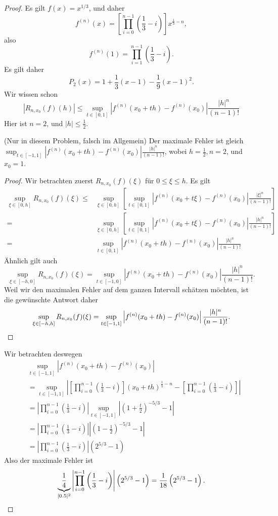 \begin{proof}
	Es gilt $f(x)=x^{1 / 3}$, und daher
	\[
		f^{(n)}(x)=\left[\prod_{i=0}^{n-1} \left( \frac{1}{3}-i \right) \right]x^{\frac{1}{3}-n} 
	,\] 
	also
	\[
		f^{(n)}(1)=\prod_{i=1}^{n-1} \left( \frac{1}{3}-i \right)  
	.\] 
	Es gilt daher
	\[
	P_2(x)=1+\frac{1}{3}(x-1)-\frac{1}{9}(x-1)^2
	.\] 
	Wir wissen schon
	\begin{equation}\tag{5.6.20}
		\left| R_{n,x_0}(f)(h) \right| \le \sup_{t\in[0,1]}\left| f^{(n)}(x_0+th)-f^{(n)}(x_0) \right| \frac{|h|^n}{(n-1)!}
	\end{equation}
	Hier ist $n=2$, und $|h|\le \frac{1}{2}$. 
\begin{tcolorbox}[title=Vereinfachung]
	(Nur in diesem Problem, falsch im Allgemein) Der maximale Fehler ist gleich $\sup_{t\in [-1,1]}\left| f^{(n)}(x_0+th)-f^{(n)}(x_0) \right| \frac{|h|^n}{(n-1)!}$, wobei $h=\frac{1}{2},n=2$, und $x_0=1$.
\begin{proof}
	Wir betrachten zuerst $R_{n,x_0}(f)(\xi)$ f\"{u}r $0\le\xi\le h$. Es gilt
	\begin{align*}
		\sup_{\xi\in [0,h]}R_{n,x_0}(f)(\xi)\le& \sup_{\xi\in [0,h]}\left[\sup_{t\in [0,1]}\left| f^{(n)}(x_0+t\xi)-f^{(n)}(x_0) \right| \frac{|\xi|^n}{(n-1)!}\right]\\
		=& \sup_{\xi\in [0,h]}\left[\sup_{t\in [0,1]}\left| f^{(n)}(x_0+t\xi)-f^{(n)}(x_0) \right| \frac{|h|^n}{(n-1)!} \right] \\
		=&\sup_{t\in [0,1]}\left| f^{(n)}(x_0+th)-f^{(n)}(x_0) \right| \frac{|h|^n}{(n-1)!}
	\end{align*}
	Ähnlich gilt auch
	\[
		\sup_{\xi\in[-h,0]}R_{n,x_0}(f)(\xi)=\sup_{t\in [-1,0]}\left| f^{(n)}(x_0+th)-f^{(n)}(x_0) \right| \frac{|h|^n}{(n-1)!}
	.\] 
	Weil wir den maximalen Fehler auf dem ganzen Intervall schätzen möchten, ist die gewünschte Antwort daher
	\[
		\sup_{\xi\in[-h,h]}R_{n,x_0}(f)(\xi)=\sup_{t\in[-1,1]}\left| f^{(n)}(x_0+th)-f^{(n)}(x_0) \right| \frac{|h|^n}{(n-1)!}
	.\qedhere\] 
\end{proof}
\end{tcolorbox}
Wir betrachten deswegen
\begin{align*}
	&\sup_{t\in [-1,1]}\left| f^{(n)}(x_0+th)-f^{(n)}(x_0) \right|\\
	&= \sup_{t\in [-1,1]}\left| \left[\prod_{i=0}^{n-1}\left( \frac{1}{3}-i \right) \right] \left( x_0+th \right) ^{\frac{1}{3}-n}-\left[ \prod_{i=0}^{n-1}\left( \frac{1}{3}-i \right)    \right]    \right|\\
	&= \left| \prod_{i=0}^{n-1}\left( \frac{1}{3}-i \right) \right|\sup_{t\in[-1,1]}\left| \left(1+\frac{t}{2}\right)^{- 5 / 3}-1 \right| \\
	&=\left| \prod_{i=0}^{n-1} \left( \frac{1}{3}-i \right)  \right|\left| \left( 1-\frac{1}{2} \right)^{- 5 / 3}-1 \right|\\
	&=\left| \prod_{i=0}^{n-1}\left( \frac{1}{3}-i \right) \right| \left( 2^{5 / 3}-1 \right)  
\end{align*}
Also der maximale Fehler ist
\[
	\underbrace{\frac{1}{4}}_{|0.5|^2}\left| \prod_{i=0}^{n-1} \left( \frac{1}{3}-i \right)   \right| \left( 2^{5 / 3}-1 \right)=\frac{1}{18}\left( 2^{5 / 3}-1 \right)  
.\qedhere\]
\end{proof}
